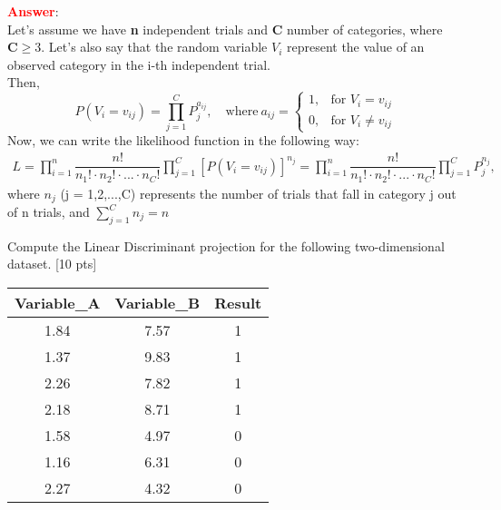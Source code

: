 \documentclass{homework}
\begin{document}
	\textbf{\textcolor{red}{Answer}}: \\
	Let's assume we have \textbf{n} independent trials and \textbf{C} number of categories, where $\mathbf{C} \ge 3$. 
	Let's also say that the random variable $V_i$ represent the value of an observed category in the i-th independent trial. \\
	Then,
	\begin{equation*}
	    P(V_i = v_{ij}) = \prod_{j = 1}^{C} P_j^{a_{ij}}, \quad \text{where}\  a_{ij} =
	    \begin{cases}
    1, & \text{for } V_{i}=v_{ij}\\
    0, & \text{for } V_{i} \neq v_{ij}
    \end{cases}
	\end{equation*}
    Now, we can write the likelihood function in the following way:
    \begin{equation*}
    \begin{gathered}
        L = \prod_{i=1}^n \dfrac{n!}{n_1! \cdot n_2! \cdot...\cdot n_C!} \prod_{j=1}^C [P(V_i = v_{ij})]^{n_j} = \prod_{i=1}^n \dfrac{n!}{n_1! \cdot n_2! \cdot...\cdot n_C!} \prod_{j=1}^C P_j^{n_j},
    \end{gathered}
    \end{equation*}
    where $n_j$ (j = 1,2,...,C) represents the number of trials that fall in category j out of n trials, and $\sum_{j=1}^C n_j = n$
	\vspace{10mm}

    
    \exercise*
    Compute the Linear Discriminant projection for the following two-dimensional dataset. [10 pts]
    \begin{table}[!h]
    \begin{center}
    \begin{tabular}{|c|c|c|}
    \hline
    Variable\_A & Variable\_B & Result \\ \hline
    1.84        & 7.57        & 1      \\ \hline
    1.37        & 9.83        & 1      \\ \hline
    2.26        & 7.82        & 1      \\ \hline
    2.18        & 8.71        & 1      \\ \hline
    1.58        & 4.97        & 0      \\ \hline
    1.16        & 6.31        & 0      \\ \hline
    2.27        & 4.32        & 0      \\ \hline
    \end{tabular}
    \end{center}
    \end{table}
    
\end{document}
